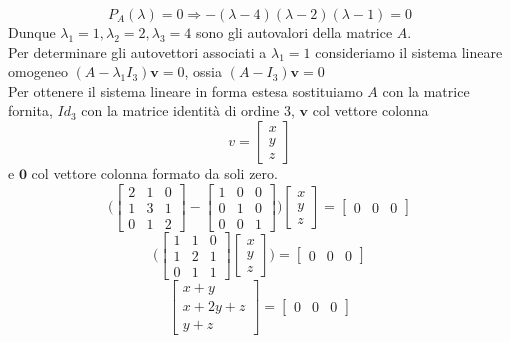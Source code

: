 \documentclass[a4paper, 10pt]{article}
\begin{document}
	\[ P_A(\lambda) = 0 \Rightarrow  -(\lambda - 4)(\lambda -2)(\lambda -1) =0 \]
	Dunque $\lambda_1 = 1, \lambda_2 = 2 , \lambda_3 = 4$ sono gli autovalori della matrice $A$. \\
	Per determinare gli autovettori associati a $\lambda_1 = 1$ consideriamo il sistema lineare omogeneo 
	$(A - \lambda_1 I_3) \textbf{v} = 0$, ossia $(A - I_3) \textbf{v} = 0$ \\
	Per ottenere il sistema lineare in forma estesa sostituiamo $A$ con la matrice fornita, $Id_3$ con la matrice 
	identità di ordine 3, $\textbf{v}$ col vettore colonna 
	\[ v = \begin{bmatrix}x \\ y \\ z \end{bmatrix} \] e $\textbf{0}$ col vettore colonna formato da soli zero.
	\[ 
		\biggl( \begin{bmatrix} 2 & 1 & 0 \\ 1 & 3 & 1 \\ 0 & 1 & 2 \end{bmatrix} - 
		\begin{bmatrix} 1 & 0 & 0 \\ 0 & 1 & 0 \\ 0 & 0 & 1 \end{bmatrix} \biggr) \begin{bmatrix} x \\ y \\ z \end{bmatrix} =
		\begin{bmatrix} 0 & 0 & 0 \end{bmatrix} 
	\]
	\[ 
		\biggl( \begin{bmatrix} 1 & 1 & 0 \\ 1 & 2 &1 \\ 0 & 1 & 1 \end{bmatrix} \begin{bmatrix} x \\ y \\ z \end{bmatrix} \biggr) =
		\begin{bmatrix} 0 & 0 & 0 \end{bmatrix} 
	\]
	\[   \begin{bmatrix} x + y \\ x + 2y + z \\ y + z \end{bmatrix} =\begin{bmatrix} 0 & 0 & 0 \end{bmatrix}  \]\
\end{document}
